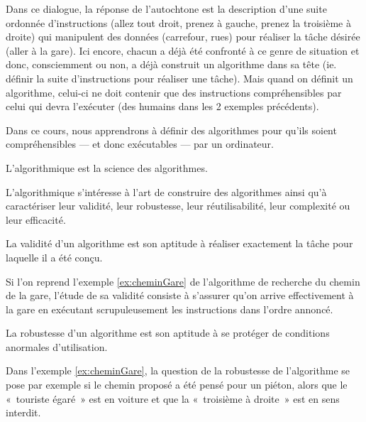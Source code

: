 Dans ce dialogue, 
la réponse de l'autochtone est la description d'une suite ordonnée
d'instruc\-tions (allez tout droit, prenez à gauche, prenez la troisième à droite) qui
manipulent des données (carrefour, rues) pour réaliser la tâche désirée (aller à la gare).
Ici encore, chacun a déjà été confronté à ce genre de situation et donc, consciemment ou non, 
a déjà construit un algorithme dans sa tête (ie. définir la suite d'instructions pour réaliser 
une tâche).
Mais quand on définit un algorithme, celui-ci ne doit contenir que des instructions 
compréhensibles par celui qui devra l'exécuter (des humains dans les 2 exemples précédents).

Dans ce cours, nous apprendrons à définir des algorithmes pour qu'ils soient 
compré\-hen\-si\-bles --- et donc exécutables --- par un ordinateur.

\begin{defin}[algorithmique]
L'algorithmique est la science des algorithmes.
\end{defin}

L'algorithmique s'intéresse à l'art de construire des algorithmes ainsi
qu'à caractériser leur validité, leur robustesse, leur réutilisabilité, 
leur complexité ou leur efficacité.

\begin{defin}
La validité d'un algorithme est son aptitude à réaliser exactement la tâche
pour laquelle il a été conçu.
\end{defin}
\noindent Si l'on reprend l'exemple \ref{ex:cheminGare} de l'algorithme de recherche du chemin
de la gare, l'étude de sa validité consiste à s'assurer qu'on arrive effectivement 
à la gare en exécutant scrupuleusement les instructions dans l'ordre annoncé.

\begin{defin}
La robustesse d'un algorithme est son aptitude à se protéger de conditions 
anormales d'utilisation.
\end{defin}
\noindent Dans l'exemple \ref{ex:cheminGare}, la question de la robustesse de l'algorithme
se pose par exemple si le chemin proposé a été pensé pour un piéton, alors que le 
«~touriste égaré~» est en voiture et que la «~troisième à droite~» est en sens interdit.


